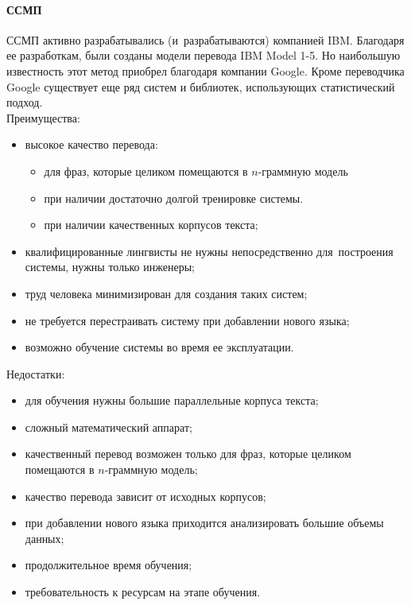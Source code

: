 \paragraph{ССМП}
ССМП активно разрабатывались (и~разрабатываются) компанией IBM. 
Благодаря ее разработкам, были созданы модели перевода IBM Model 1-5. 
Но наибольшую известность этот метод приобрел благодаря компании Google. 
Кроме переводчика Google существует еще ряд систем и библиотек, 
использующих статистический подход. \\
Преимущества:
\begin{itemize}
	\item  высокое качество перевода:
	\begin{itemize}
		\item  для фраз, которые целиком помещаются в $n$-граммную модель
		\item  при наличии достаточно долгой тренировке системы.
		\item  при наличии качественных корпусов текста;
	\end{itemize}
	\item  квалифицированные лингвисты не нужны непосредственно для~построения системы, нужны только инженеры;
	\item  труд человека минимизирован для создания таких систем;
	\item  не требуется перестраивать систему при добавлении нового языка;
	\item  возможно обучение системы во время ее эксплуатации.
\end{itemize}
Недостатки: 
\begin{itemize}
	\item  для обучения нужны большие параллельные корпуса текста;
	\item  сложный математический аппарат;
	\item  качественный перевод возможен только для фраз, которые целиком помещаются в $n$-граммную модель;
	\item  качество перевода зависит от исходных корпусов;
	\item  при добавлении нового языка приходится анализировать большие объемы данных;
	\item  продолжительное время обучения;
	\item  требовательность к ресурсам на этапе обучения.
\end{itemize}

\pagebreak
